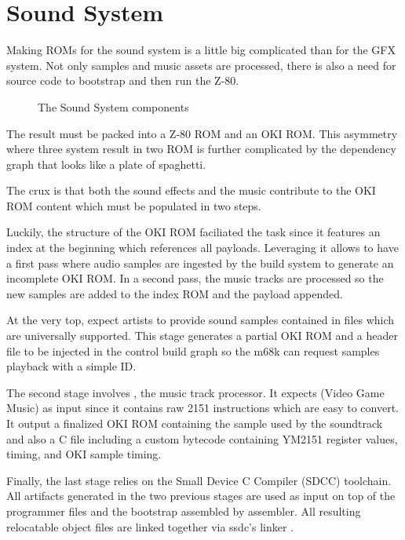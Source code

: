 \chapter{Sound System}
Making ROMs for the sound system is a little big complicated than for the GFX system. Not only samples and music assets are processed, there is also a need for source code to bootstrap and then run the Z-80. 

\begin{figure}[H]
\caption*{The Sound System components}
\end{figure}

The result must be packed into a Z-80 ROM and an OKI ROM. This asymmetry where three system result in two ROM is further complicated by the dependency graph that looks like a plate of spaghetti. 

The crux is that both the sound effects and the music contribute to the OKI ROM content which must be populated in two steps.




Luckily, the structure of the OKI ROM faciliated the task since it features an index at the beginning which references all payloads. Leveraging it allows to have a first pass where audio samples are ingested by the build system to generate an incomplete OKI ROM. In a second pass, the music tracks are processed so the new samples are added to the index ROM and the payload appended.

At the very top,  expect artists to provide sound samples contained in  files which are universally supported. This stage generates a partial OKI ROM and a  header file to be injected in the control build graph so the m68k can request samples playback with a simple ID.

The second stage involves , the music track processor. It expects  (Video Game Music) as input since it contains raw 2151 instructions which are easy to convert. It output a finalized OKI ROM containing the sample used by the soundtrack and also a  C file including a custom bytecode containing YM2151 register values, timing, and OKI sample timing.

Finally, the last stage relies on the Small Device C Compiler (SDCC) toolchain. All artifacts generated in the two previous stages are used as input on top of the programmer  files and the bootstrap  assembled by  assembler. All resulting relocatable object files  are linked together via ssdc's linker . 



